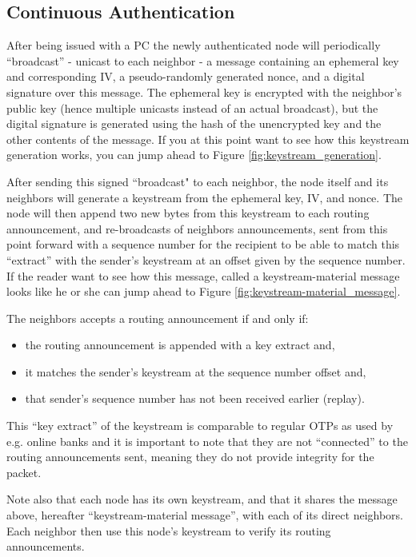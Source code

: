 \subsection{Continuous Authentication}
After being issued with a \ac{PC} the newly authenticated node will periodically
``broadcast'' - unicast to each neighbor - a message containing an ephemeral key
and corresponding \ac{IV}, a pseudo-randomly generated nonce, and a digital
signature over this message. The ephemeral key is encrypted with the neighbor's
public key (hence multiple unicasts instead of an actual broadcast), but the
digital signature is generated using the hash of the unencrypted key and the
other contents of the message. If you at this point want to see how this
keystream generation works, you can jump ahead to Figure
\ref{fig:keystream_generation}.

After sending this signed ``broadcast" to each neighbor, the node itself and its
neighbors will generate a keystream from the ephemeral key, \ac{IV}, and nonce.
The node will then append two new bytes from this keystream to each routing
announcement, and re-broadcasts of neighbors announcements, sent from this point
forward with a sequence number for the recipient to be able to match this
``extract'' with the sender's keystream at an offset given by the sequence
number. If the reader want to see how this message, called a keystream-material message looks
like he or she can jump ahead to Figure \ref{fig:keystream-material_message}.

The neighbors accepts a routing announcement if and only if:

\begin{itemize}
  \item the routing announcement is appended with a key extract and,
  \item it matches the sender's keystream at the sequence number offset and,
  \item that sender's sequence number has not been received earlier (replay).
\end{itemize}

This ``key extract'' of the keystream is comparable to regular \acp{OTP} as
used by e.g. online banks and it is important to note that they are not ``connected''
to the routing announcements sent, meaning they do not provide integrity for the
packet.

Note also that each node has its own keystream, and that it shares the message
above, hereafter ``keystream-material message'', with each of its direct
neighbors. Each neighbor then use this node's keystream to verify its routing
announcements.

